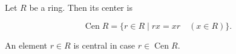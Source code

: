Let $R$ be a ring. Then its center is

$$\operatorname{Cen} R = \{r \in R \mid rx = xr \quad (x \in R)\}.$$

An element $r \in R$ is central in case $r \in \operatorname{Cen} R$.
